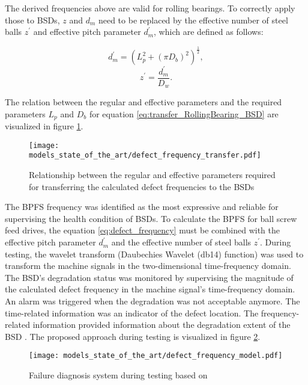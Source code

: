 The derived frequencies above are valid for rolling bearings. To correctly apply those to BSDs, $z$ and $d_{m}$ need to be replaced by the effective number of steel balls $z^{'}$ and effective pitch parameter $d_{m}^{'}$, which are defined as follows:

\begin{equation} \label{eq:transfer_RollingBearing_BSD}
    d_{m}^{'} = (L_{p}^{2}+(\pi D_{b})^{2})^{\frac{1}{2}},
\end{equation}
\begin{equation}
    z^{'} = \frac{d_{m}^{'}}{D_{w}}.
\end{equation}

The relation between the regular and effective parameters and the required parameters $L_{p}$ and $D_{b}$ for equation  \ref{eq:transfer_RollingBearing_BSD} are visualized in figure \ref{fig:defect_frequency_transfer}. 

\begin{figure}[H]
  \centering
  \texttt{[image: models\_state\_of\_the\_art/defect\_frequency\_transfer.pdf]}
  \caption{Relationship between the regular and effective parameters required for transferring the calculated defect frequencies to the BSDs \cite{Lee2015}}
  \label{fig:defect_frequency_transfer}
\end{figure}

The BPFS frequency was identified as the most expressive and reliable for supervising the health condition of BSDs. To calculate the BPFS for ball screw feed drives, the equation \ref{eq:defect_frequency} must be combined with the effective pitch parameter $d_{m}^{'}$ and the effective number of steel balls $z^{'}$. During testing, the wavelet transform (Daubechies Wavelet (db14) function) was used to transform the machine signals in the two-dimensional time-frequency domain. The BSD's degradation status was monitored by supervising the magnitude of the calculated defect frequency in the machine signal's time-frequency domain. An alarm was triggered when the degradation was not acceptable anymore. The time-related information was an indicator of the defect location. The frequency-related information provided information about the degradation extent of the BSD \cite{Lee2015}. The proposed approach during testing is visualized in figure \ref{fig:defect_frequency_model}. 


\begin{figure}[H]
  \centering
  \texttt{[image: models\_state\_of\_the\_art/defect\_frequency\_model.pdf]}
  \caption{Failure diagnosis system during testing based on \cite{Lee2015}}
  \label{fig:defect_frequency_model}
\end{figure}

